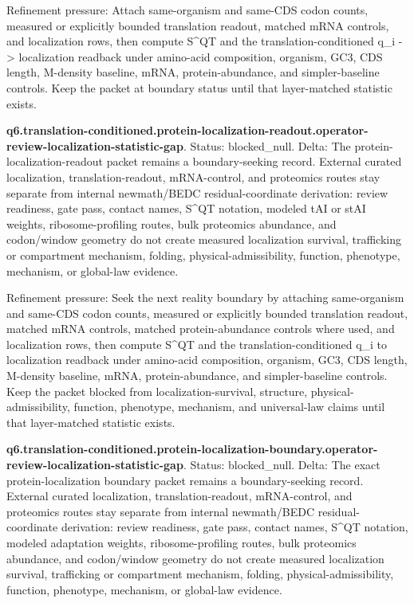 Refinement pressure: Attach same-organism and same-CDS codon counts, measured or explicitly bounded translation readout, matched mRNA controls, and localization rows, then compute S\textasciicircum{}QT and the translation-conditioned q\_i -> localization readback under amino-acid composition, organism, GC3, CDS length, M-density baseline, mRNA, protein-abundance, and simpler-baseline controls. Keep the packet at boundary status until that layer-matched statistic exists.

\textbf{q6.translation-conditioned.protein-localization-readout.operator-review-localization-statistic-gap}. Status: blocked\_null. Delta: The protein-localization-readout packet remains a boundary-seeking record. External curated localization, translation-readout, mRNA-control, and proteomics routes stay separate from internal newmath/BEDC residual-coordinate derivation: review readiness, gate pass, contact names, S\textasciicircum{}QT notation, modeled tAI or stAI weights, ribosome-profiling routes, bulk proteomics abundance, and codon/window geometry do not create measured localization survival, trafficking or compartment mechanism, folding, physical-admissibility, function, phenotype, mechanism, or global-law evidence.

Refinement pressure: Seek the next reality boundary by attaching same-organism and same-CDS codon counts, measured or explicitly bounded translation readout, matched mRNA controls, matched protein-abundance controls where used, and localization rows, then compute S\textasciicircum{}QT and the translation-conditioned q\_i to localization readback under amino-acid composition, organism, GC3, CDS length, M-density baseline, mRNA, protein-abundance, and simpler-baseline controls. Keep the packet blocked from localization-survival, structure, physical-admissibility, function, phenotype, mechanism, and universal-law claims until that layer-matched statistic exists.

\textbf{q6.translation-conditioned.protein-localization-boundary.operator-review-localization-statistic-gap}. Status: blocked\_null. Delta: The exact protein-localization boundary packet remains a boundary-seeking record. External curated localization, translation-readout, mRNA-control, and proteomics routes stay separate from internal newmath/BEDC residual-coordinate derivation: review readiness, gate pass, contact names, S\textasciicircum{}QT notation, modeled adaptation weights, ribosome-profiling routes, bulk proteomics abundance, and codon/window geometry do not create measured localization survival, trafficking or compartment mechanism, folding, physical-admissibility, function, phenotype, mechanism, or global-law evidence.

